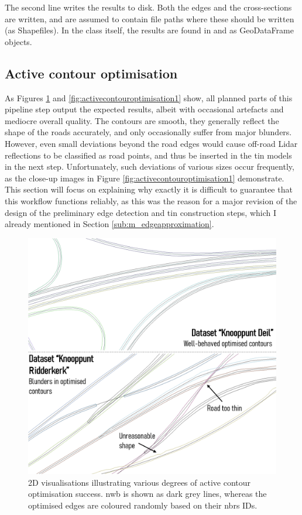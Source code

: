 The second line writes the results to disk. Both the edges and the cross-sections are written,  and  are assumed to contain file paths where these should be written (as Shapefiles). In the class itself, the results are found in  and  as GeoDataFrame objects.

\subsection{Active contour optimisation}
\label{sub:r_activecontours}

As Figures \ref{fig:activecontouroptimisation0} and \ref{fig:activecontouroptimisation1} show, all planned parts of this pipeline step output the expected results, albeit with occasional artefacts and mediocre overall quality. The contours are smooth, they generally reflect the shape of the roads accurately, and only occasionally suffer from major blunders. However, even small deviations beyond the road edges would cause off-road Lidar reflections to be classified as road points, and thus be inserted in the \ac{tin} models in the next step. Unfortunately, such deviations of various sizes occur frequently, as the close-up images in Figure \ref{fig:activecontouroptimisation1} demonstrate. This section will focus on explaining why exactly it is difficult to guarantee that this workflow functions reliably, as this was the reason for a major revision of the design of the preliminary edge detection and \ac{tin} construction steps, which I already mentioned in Section \ref{sub:m_edgeapproximation}.

\begin{figure}[h]
    \centering
    \includegraphics[width=0.88\linewidth]{final_report/figs/activecontouroptimisation0.png}
    \caption[Renders illustrating the results of active contour optimisation]{2D visualisations illustrating various degrees of active contour optimisation success. \ac{nwb} is shown as dark grey lines, whereas the optimised edges are coloured randomly based on their \ac{nbrs} IDs.}
    \label{fig:activecontouroptimisation0}
\end{figure}

